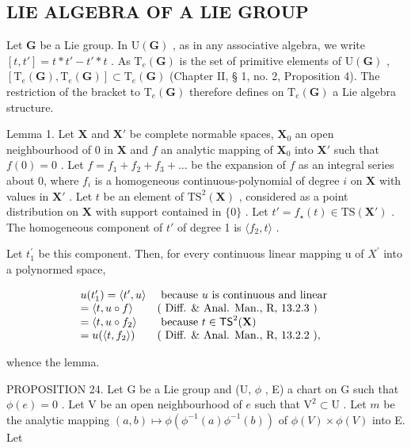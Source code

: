 \subsection{LIE ALGEBRA OF A LIE GROUP}

Let \(\mathbf{G}\) be a Lie group. In \(\mathrm{U}(\mathbf{G})\) , as in any associative algebra, we write \([t, t'] = t * t' - t' * t\) . As \(\mathrm{T}_{e}(\mathbf{G})\) is the set of primitive elements of \(\mathrm{U}(\mathbf{G})\) , \([\mathrm{T}_{e}(\mathbf{G}), \mathrm{T}_{e}(\mathbf{G})] \subset \mathrm{T}_{e}(\mathbf{G})\) (Chapter II, § 1, no. 2, Proposition 4). The restriction of the bracket to \(\mathrm{T}_{e}(\mathbf{G})\) therefore defines on \(\mathrm{T}_{e}(\mathbf{G})\) a Lie algebra structure.

Lemma 1. Let \(\mathbf{X}\) and \(\mathbf{X}'\) be complete normable spaces, \(\mathbf{X}_0\) an open neighbourhood of 0 in \(\mathbf{X}\) and \(f\) an analytic mapping of \(\mathbf{X}_0\) into \(\mathbf{X}'\) such that \(f(0) = 0\) . Let \(f = f_1 + f_2 + f_3 + \dots\) be the expansion of \(f\) as an integral series about 0, where \(f_i\) is a homogeneous continuous-polynomial of degree \(i\) on \(\mathbf{X}\) with values in \(\mathbf{X}'\) . Let \(t\) be an element of \(\mathrm{TS}^2 (\mathbf{X})\) , considered as a point distribution on \(\mathbf{X}\) with support contained in \(\{0\}\) . Let \(t' = f_{\star}(t) \in \mathrm{TS}(\mathbf{X}')\) . The homogeneous component of \(t'\) of degree 1 is \(\langle f_2, t \rangle\) .

Let \(t_{1}^{\prime}\) be this component. Then, for every continuous linear mapping u of \(X^{\prime}\) into a polynormed space,

\[
\begin{array}{l l} u (t _ {1} ^ {\prime}) = \langle t ^ {\prime}, u \rangle & \text { because   } u \text {   is   continuous   and   linear } \\ = \langle t, u \circ f \rangle & (\text { Diff.   \&   Anal.   Man.,   R,   13.2.3 }) \\ = \langle t, u \circ f _ {2} \rangle & \text { because   } t \in \mathsf {T S} ^ {2} (\mathbf {X}) \\ = u (\langle t, f _ {2} \rangle) & (\text { Diff.   \&   Anal.   Man.,   R,   13.2.2 }), \end{array}
\]

whence the lemma.

PROPOSITION 24. Let G be a Lie group and (U, \(\phi\) , E) a chart on G such that \(\phi(e) = 0\) . Let V be an open neighbourhood of \(e\) such that \(\mathrm{V}^2 \subset \mathrm{U}\) . Let \(m\) be the analytic mapping \((a, b) \mapsto \phi(\phi^{-1}(a)\phi^{-1}(b))\) of \(\phi(V) \times \phi(V)\) into E. Let

